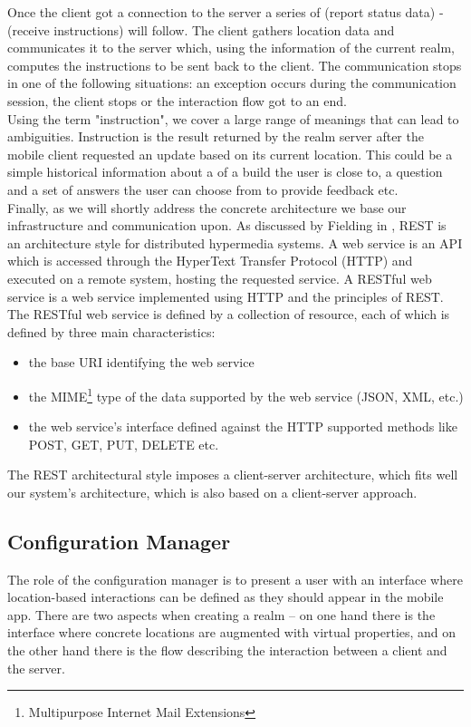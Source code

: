 \noindent Once the client got a connection to the server a series of (report status data) - (receive instructions) will follow. The client gathers location data and communicates it to the server which, using the information of the current realm, computes the instructions to be sent back to the client. The communication stops in one of the following situations: an exception occurs during the communication session, the client stops or the interaction flow got to an end.
\\

\noindent Using the term "instruction", we cover a large range of meanings that can lead to ambiguities. Instruction is the result returned by the realm server after the mobile client requested an update based on its current location. This could be a simple historical information about a of a build the user is close to, a question and a set of answers the user can choose from to provide feedback etc.
\\

\noindent Finally, as we will shortly address the concrete architecture we base our infrastructure and communication upon. As discussed by Fielding in \cite{Fielding:2000}, REST is an architecture style for distributed hypermedia systems. A web service is an API which is accessed through the HyperText Transfer Protocol (HTTP) and executed on a remote system, hosting the requested service. A RESTful web service is a web service implemented using HTTP and the principles of REST. The RESTful web service is defined by a collection of resource, each of which is defined by three main characteristics:
\begin{itemize}
  \item the base URI identifying the web service
  \item the MIME\footnote{Multipurpose Internet Mail Extensions} type of the
  data supported by the web service (JSON, XML, etc.)
  \item the web service's interface defined against the HTTP supported methods
  like POST, GET, PUT, DELETE etc.
\end{itemize}
The REST architectural style imposes a client-server architecture, which fits well our system's architecture, which is also based on a client-server approach.

\subsection{Configuration Manager} %
\label{sub:configuration_manager}
\noindent The role of the configuration manager is to present a user with an interface where location-based interactions can be defined as they should appear in the mobile app. There are two aspects when creating a realm -- on one hand there is the interface where concrete locations are augmented with virtual properties, and on the other hand there is the flow describing the interaction between a client and the server.
\\

